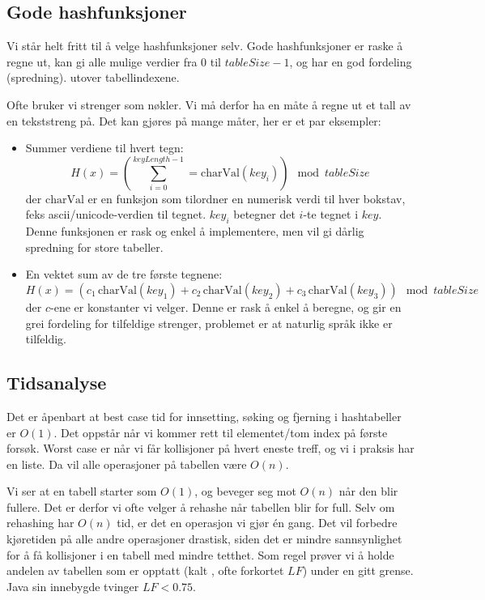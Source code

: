 \subsection{Gode hashfunksjoner}
Vi står helt fritt til å velge hashfunksjoner selv. Gode hashfunksjoner er raske å regne ut, kan gi alle mulige verdier fra $ 0 $ til $ tableSize - 1 $, og har en god fordeling (spredning). utover tabellindexene. 

Ofte bruker vi strenger som nøkler. Vi må derfor ha en måte å regne ut et tall av en tekststreng på. Det kan gjøres på mange måter, her er et par eksempler:
\begin{itemize}
\item Summer verdiene til hvert tegn:
\[ H(x) = \left( \sum_{i=0}^{keyLength-1} = \text{charVal}(key_i) \right) \mod{tableSize} \]
der $ \text{charVal} $ er en funksjon som tilordner en numerisk verdi til hver bokstav, feks ascii/unicode-verdien til tegnet. $ key_i $ betegner det $ i $-te tegnet i $ key $. Denne funksjonen er rask og enkel å implementere, men vil gi dårlig spredning for store tabeller. 
\item En vektet sum av de tre første tegnene:
\[ H(x) = \left( c_1\,\text{charVal}(key_1) + c_2\,\text{charVal}(key_2) + c_3\,\text{charVal}(key_3)\right)  \mod{tableSize} \]
der $ c $-ene er konstanter vi velger. Denne er rask å enkel å beregne, og gir en grei fordeling for tilfeldige strenger, problemet er at naturlig språk ikke er tilfeldig.
\end{itemize}


\subsection{Tidsanalyse}
Det er åpenbart at best case tid for innsetting, søking og fjerning i hashtabeller er $ O(1) $. Det oppstår når vi kommer rett til elementet/tom index på første forsøk. Worst case er når vi får kollisjoner på hvert eneste treff, og vi i praksis har en liste. Da vil alle operasjoner på tabellen være $ O(n) $. 

Vi ser at en tabell starter som $ O(1) $, og beveger seg mot $ O(n) $ når den blir fullere. Det er derfor vi ofte velger å rehashe når tabellen blir for full. Selv om rehashing har $ O(n) $ tid, er det en operasjon vi gjør én gang. Det vil forbedre kjøretiden på alle andre operasjoner drastisk, siden det er mindre sannsynlighet for å få kollisjoner i en tabell med mindre tetthet. Som regel prøver vi å holde andelen av tabellen som er opptatt (kalt , ofte forkortet $ LF $) under en gitt grense. Java sin innebygde  tvinger $ LF < 0.75 $.
